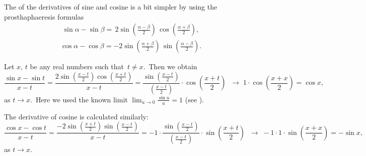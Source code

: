 \documentclass[12pt]{article}
\theoremstyle{definition}
\begin{document}
The  of the derivatives of sine and cosine is a bit simpler by using the prosthaphaeresis formulas
\begin{align}
\sin\alpha-\sin\beta = \,2\sin \left( \frac{\alpha\!-\!\beta}{2} \right) \,\cos \left( \frac{\alpha\!+\!\beta}{2} \right),
\end{align}
\begin{align}
\cos\alpha-\cos\beta = -2\sin \left( \frac{\alpha\!+\!\beta}{2} \right) \, \sin\left( \frac{\alpha\!-\!\beta}{2} \right).
\end{align}

Let $x,\,t$ be any real numbers such that\, $t \neq x$.\, Then we obtain
$$\frac{\sin{x}-\sin{t}}{x-t} = 
\frac{2\sin \left( \frac{x-t}{2} \right) \cos \left( \frac{x+t}{2} \right) }{x-t} =
\frac{\sin \left( \frac{x-t}{2} \right) }{\left( \frac{x-t}{2} \right) }\cdot\cos \left( \frac{x\!+\!t}{2} \right) \;\;
\longrightarrow\; 1\cdot\cos \left( \frac{x\!+\!x}{2} \right) = \cos{x},$$
as\; $t\to x$.\, Here we used the known limit \;$\displaystyle\lim_{u\to0}\frac{\sin{u}}{u} = 1$\; (see ).

The derivative of cosine is calculated similarly:
$$\frac{\cos{x}-\cos{t}}{x-t} = \frac{-2\sin \left( \frac{x+t}{2} \right) \sin\left( \frac{x-t}{2} \right)}{x-t} =-1 \cdot \frac{\sin\left( \frac{x-t}{2} \right) }{\left( \frac{x-t}{2} \right) }\cdot \sin \left( \frac{x\!+\!t}{2} \right) \;\; \longrightarrow\; -1 \cdot 1\cdot \sin \left( \frac{x\!+\!x}{2} \right) =-\sin{x},$$
as\; $t\to x$.
\end{document}
